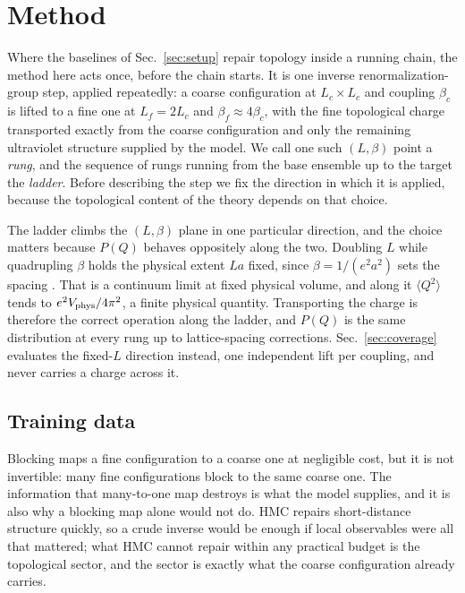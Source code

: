 \documentclass[prd, twocolumn, superscriptaddress, nofootinbib,floatfix]{revtex4-2}
\DeclareRobustCommand{\sect}[1]{Sec.~\ref{sec:#1}}
\begin{document}
\section{Method}
\label{sec:method}
Where the baselines of \sect{setup} repair topology inside a running chain, the
method here acts once, before the chain starts. It is one inverse
renormalization-group step, applied repeatedly: a coarse configuration at
$L_c\times L_c$ and coupling $\beta_c$ is lifted to a fine one at $L_f=2L_c$ and
$\beta_f\approx4\beta_c$, with the fine topological charge transported exactly
from the coarse configuration and only the remaining ultraviolet structure
supplied by the model. We call one such $(L,\beta)$ point a \emph{rung}, and the
sequence of rungs running from the base ensemble up to the target the
\emph{ladder}. Before describing the step we fix the direction in which it is
applied, because the topological content of the theory depends on that choice.

The ladder climbs the $(L,\beta)$ plane in one particular direction, and the
choice matters because $P(Q)$ behaves oppositely along the two. Doubling $L$
while quadrupling $\beta$ holds the physical extent $La$ fixed, since
$\beta=1/(e^2a^2)$ sets the spacing \cite{gattringerlang2010}. That is a
continuum limit at fixed physical volume, and along it $\langle Q^2\rangle$
tends to $e^2V_{\rm phys}/4\pi^2$, a finite physical quantity. Transporting the charge is therefore the correct operation along the
ladder, and $P(Q)$ is the same distribution at every rung up to lattice-spacing
corrections. \sect{coverage} evaluates the fixed-$L$ direction instead, one
independent lift per coupling, and never carries a charge across it.

\subsection{Training data}
\label{sec:naive-blocking}


Blocking maps a fine configuration to a coarse one at negligible cost, but it
is not invertible: many fine
configurations block to the same coarse one. The information that many-to-one
map destroys is what the model supplies, and it is
also why a blocking map alone would not do. HMC repairs short-distance
structure quickly, so a crude inverse would be enough if local observables were
all that mattered; what HMC cannot repair within any practical budget is the
topological sector, and the sector is exactly what the coarse configuration
already carries.
\end{document}
